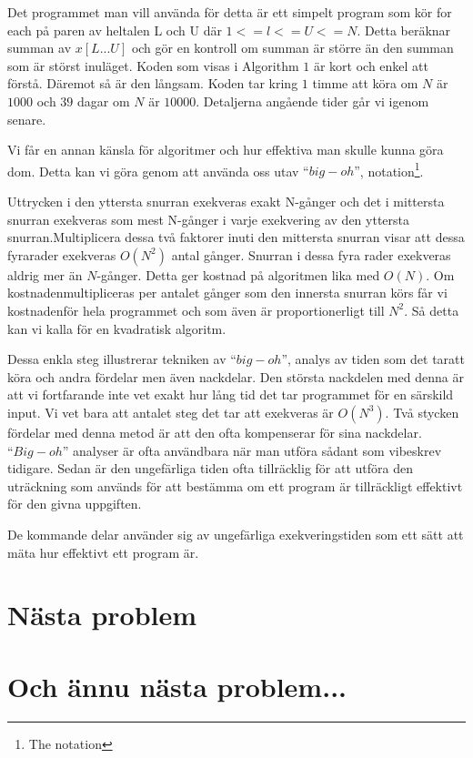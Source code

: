 \documentclass[a4paper,12pt]{article}
\begin{document}
 
  Det programmet man vill använda för detta är ett simpelt program som kör for
each på paren av heltalen L och U där $1 <=l <= U <= N$. Detta beräknar summan
av
$x[L...U]$ och gör en kontroll om summan är större än den summan som är störst
inuläget. Koden som visas i Algorithm $1$ är kort och enkel att förstå. Däremot
så
är den långsam. Koden tar kring $1$ timme att köra om $N$ är $1000$ och $39$
dagar om $N$
  är $10000$. Detaljerna angående tider går vi igenom senare.

 
 Vi får en annan känsla för algoritmer och hur effektiva man skulle kunna göra
dom. Detta kan vi göra genom att använda oss utav $“big-oh”$,
notation\footnote{The notation}.

Uttrycken i den yttersta snurran exekveras exakt N-gånger och det i mittersta
snurran exekveras som mest N-gånger i varje exekvering av den yttersta
snurran.Multiplicera dessa två faktorer inuti den mittersta snurran visar att
dessa fyrarader exekveras $O(N^2)$ antal gånger. Snurran i dessa fyra rader
exekveras aldrig mer än $N$-gånger. Detta ger kostnad på algoritmen lika med
 $O(N)$. Om kostnadenmultipliceras per antalet gånger som den innersta snurran
körs får vi kostnadenför hela programmet och som även är proportionerligt till 
$N^2$. Så detta kan vi kalla för en kvadratisk algoritm.


Dessa enkla steg illustrerar tekniken av $“big-oh”$, analys av tiden som det
taratt köra och andra fördelar men även nackdelar. Den största nackdelen med
denna är att vi fortfarande inte vet exakt hur lång tid det tar programmet för
en
särskild input. Vi vet bara att antalet steg det tar att exekveras är $O(N^3)$.
Två stycken fördelar med denna metod är att den ofta kompenserar för sina
nackdelar. $“Big-oh”$ analyser är ofta användbara när man utföra sådant som
vibeskrev tidigare. Sedan är den ungefärliga tiden ofta tillräcklig för att
utföra den uträckning som används för att bestämma om ett program är
tillräckligt
  effektivt för den givna uppgiften.


De kommande delar använder sig av ungefärliga exekveringstiden som ett sätt att
mäta hur effektivt ett program är.



\section{Nästa problem}
\label{sec:uppg2}


\section{Och ännu nästa problem...}
\label{sec:uppgN}
\end{document}
